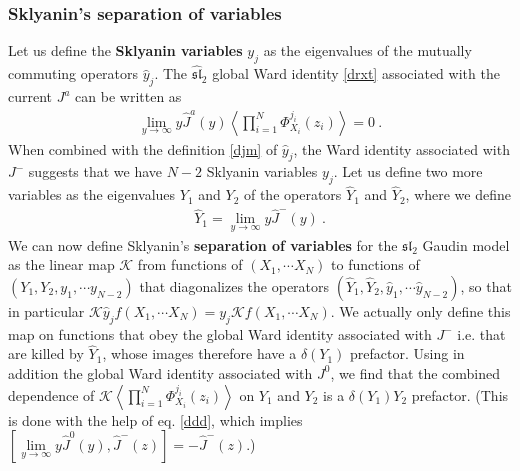 \documentclass[12pt, a4paper, notitlepage, twoside]{report}
\numberwithin{equation}{section}
\theoremstyle{break}
\begin{document}
\subsubsection{Sklyanin's separation of variables}

Let us define the
\textbf{\boldmath Sklyanin variables} $y_j$ as the eigenvalues of the mutually commuting operators $\hat{y}_j$. 
The $\widehat{\mathfrak{sl}}_2$ global Ward identity \eqref{drxt} associated with the current $J^a$ can be written as 
\begin{align}
 \underset{y\to \infty}{\lim} y \hat{J}^a(y) \left\langle \prod_{i=1}^N \Phi^{j_i}_{X_i}(z_i)\right\rangle = 0\ .
\end{align}
When combined with the definition \eqref{djm} of $\hat{y}_j$, the Ward identity associated with $J^-$ suggests that we have $N-2$ Sklyanin variables $y_j$.
Let us define two more variables as the eigenvalues $Y_1$ and $Y_2$ of the operators $\hat{Y}_1$ and $\hat{Y}_2$, where we define
\begin{align}
 \hat{Y}_1 = \underset{y\to \infty}{\lim} y \hat{J}^-(y)\ .
\end{align}
We can now define Sklyanin's \textbf{\boldmath separation of variables} for the $\mathfrak{sl}_2$ Gaudin model as the linear 
map $\mathcal{K}$ from functions of $(X_1,\cdots X_N)$ to functions of $(Y_1,Y_2,y_1,\cdots y_{N-2})$ that diagonalizes the operators $(\hat{Y}_1,\hat{Y}_2,\hat{y}_1,\cdots \hat{y}_{N-2})$, so that in particular $\mathcal{K} \hat{y}_j f(X_1,\cdots X_N) = y_j \mathcal{K} f(X_1,\cdots X_N)$.
We actually only define this map on 
functions that obey the global Ward identity associated with $J^-$ i.e.
that are killed by $\hat{Y}_1$, whose images therefore have a $\delta(Y_1)$ prefactor.
Using in addition the global Ward identity associated with $J^0$, we find that the combined dependence of $\mathcal{K}\left\langle \prod_{i=1}^N \Phi^{j_i}_{X_i}(z_i)\right\rangle$ on $Y_1$ and $Y_2$ is a $\delta(Y_1)Y_2$ prefactor.
(This is done with the help of eq. \eqref{ddd}, which implies $[\underset{y\to \infty}{\lim} y \hat{J}^0(y),\hat{J}^-(z)]=-\hat{J}^-(z)$.)
\end{document}
